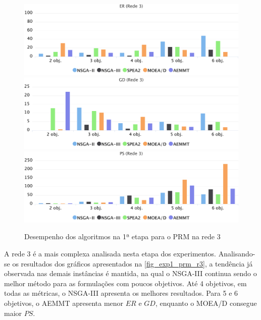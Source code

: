\begin{figure}[!htbp]
	\includegraphics[width=1\textwidth]{cap_experimentos/figs/etapa1/er-mrp-r3}
	\includegraphics[width=1\textwidth]{cap_experimentos/figs/etapa1/gd-mrp-r3}
	\includegraphics[width=1\textwidth]{cap_experimentos/figs/etapa1/ps-mrp-r3}
	\caption{\label{fig_exp1_prm_r3}Desempenho dos algoritmos na 1ª etapa para o PRM na rede 3}
\end{figure}

A rede 3 é a mais complexa analisada nesta etapa dos experimentos. Analisando-se os resultados dos gráficos apresentados na \autoref{fig_exp1_prm_r3}, a tendência já observada nas demais instâncias é mantida, na qual o NSGA-III continua sendo o melhor método para as formulações com poucos objetivos. Até 4 objetivos, em todas as métricas, o NSGA-III apresenta os melhores resultados. Para 5 e 6 objetivos, o AEMMT apresenta menor $ER$ e $GD$, enquanto o MOEA/D consegue maior $PS$.

